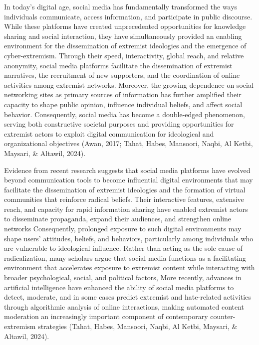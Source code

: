 \documentclass[10pt]{NSP1}
\begin{document}
\par\medskip{}\smallskip

In today's digital age, social media has fundamentally transformed the ways individuals communicate, access information, and participate in public discourse. While these platforms have created unprecedented opportunities for knowledge sharing and social interaction, they have simultaneously provided an enabling environment for the dissemination of extremist ideologies and the emergence of cyber-extremism. Through their speed, interactivity, global reach, and relative anonymity, social media platforms facilitate the dissemination of extremist narratives, the recruitment of new supporters, and the coordination of online activities among extremist networks. Moreover, the growing dependence on social networking sites as primary sources of information has further amplified their capacity to shape public opinion, influence individual beliefs, and affect social behavior. Consequently, social media has become a double-edged phenomenon, serving both constructive societal purposes and providing opportunities for extremist actors to exploit digital communication for ideological and organizational objectives (Awan, 2017; Tahat, Habes, Mansoori, Naqbi, Al Ketbi, Maysari, \& Altawil, 2024).

Evidence from recent research suggests that social media platforms have evolved beyond communication tools to become influential digital environments that may facilitate the dissemination of extremist ideologies and the formation of virtual communities that reinforce radical beliefs. Their interactive features, extensive reach, and capacity for rapid information sharing have enabled extremist actors to disseminate propaganda, expand their audiences, and strengthen online networks Consequently, prolonged exposure to such digital environments may shape users' attitudes, beliefs, and behaviors, particularly among individuals who are vulnerable to ideological influence. Rather than acting as the sole cause of radicalization, many scholars argue that social media functions as a facilitating environment that accelerates exposure to extremist content while interacting with broader psychological, social, and political factors, More recently, advances in artificial intelligence have enhanced the ability of social media platforms to detect, moderate, and in some cases predict extremist and hate-related activities through algorithmic analysis of online interactions, making automated content moderation an increasingly important component of contemporary counter-extremism strategies (Tahat, Habes, Mansoori, Naqbi, Al Ketbi, Maysari, \& Altawil, 2024).
\end{document}

